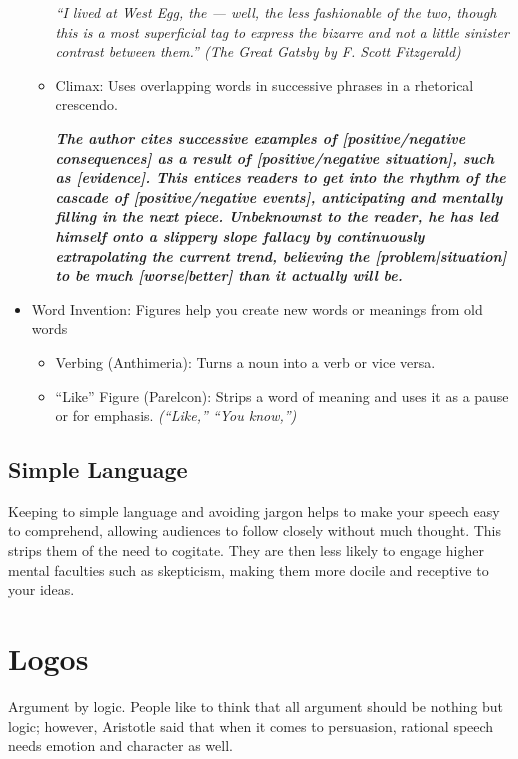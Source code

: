 \begin{itemize}
\begin{itemize}
			\textit{``I lived at West Egg, the — well, the less fashionable of the two, though this is a most superficial tag to express the bizarre and not a little sinister contrast between them.'' (The Great Gatsby by F. Scott Fitzgerald)}
			\item Climax: Uses overlapping words in successive phrases in a rhetorical crescendo.
			
			\textbf{\emph{The author cites successive examples of [positive/negative consequences] as a result of [positive/negative situation], such as [evidence]. This entices readers to get into the rhythm of the cascade of [positive/negative events], anticipating and mentally filling in the next piece. Unbeknownst to the reader, he has led himself onto a slippery slope fallacy by continuously extrapolating the current trend, believing the [problem|situation] to be much [worse|better] than it actually will be.}}
			
		\end{itemize}
	\item Word Invention: Figures help you create new words or meanings from old words
		\begin{itemize}
			\item Verbing (Anthimeria): Turns a noun into a verb or vice versa.
			\item ``Like'' Figure (Parelcon): Strips a word of meaning and uses it as a pause or for emphasis. \emph{(``Like,'' ``You know,'')}
		\end{itemize}
\end{itemize}

\subsection{Simple Language}
Keeping to simple language and avoiding jargon helps to make your speech easy to comprehend, allowing audiences to follow closely without much thought. This strips them of the need to cogitate. They are then less likely to engage higher mental faculties such as skepticism, making them more docile and receptive to your ideas.

\section{Logos}
Argument by logic. People like to think that all argument should be nothing but logic; however, Aristotle said that when it comes to persuasion, rational speech needs emotion and character as well.

